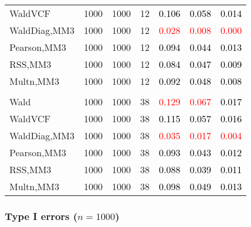 \documentclass[
]{article}
\begin{document}
\begin{table}[H]
{\begin{tabular}[t]{lrrrrrr}
\hspace{1em}WaldVCF & 1000 & 1000 & 12 & \textcolor{black}{0.106} & \textcolor{black}{0.058} & \textcolor{black}{0.014}\\
\hspace{1em}WaldDiag,MM3 & 1000 & 1000 & 12 & \textcolor{red}{0.028} & \textcolor{red}{0.008} & \textcolor{red}{0.000}\\
\hspace{1em}Pearson,MM3 & 1000 & 1000 & 12 & \textcolor{black}{0.094} & \textcolor{black}{0.044} & \textcolor{black}{0.013}\\
\hspace{1em}RSS,MM3 & 1000 & 1000 & 12 & \textcolor{black}{0.084} & \textcolor{black}{0.047} & \textcolor{black}{0.009}\\
\hspace{1em}Multn,MM3 & 1000 & 1000 & 12 & \textcolor{black}{0.092} & \textcolor{black}{0.048} & \textcolor{black}{0.008}\\
\addlinespace[0.3em]
\multicolumn{7}{l}{\textbf{3F 15V}}\\
\hspace{1em}Wald & 1000 & 1000 & 38 & \textcolor{red}{0.129} & \textcolor{red}{0.067} & \textcolor{black}{0.017}\\
\hspace{1em}WaldVCF & 1000 & 1000 & 38 & \textcolor{black}{0.115} & \textcolor{black}{0.057} & \textcolor{black}{0.016}\\
\hspace{1em}WaldDiag,MM3 & 1000 & 1000 & 38 & \textcolor{red}{0.035} & \textcolor{red}{0.017} & \textcolor{red}{0.004}\\
\hspace{1em}Pearson,MM3 & 1000 & 1000 & 38 & \textcolor{black}{0.093} & \textcolor{black}{0.043} & \textcolor{black}{0.012}\\
\hspace{1em}RSS,MM3 & 1000 & 1000 & 38 & \textcolor{black}{0.088} & \textcolor{black}{0.039} & \textcolor{black}{0.011}\\
\hspace{1em}Multn,MM3 & 1000 & 1000 & 38 & \textcolor{black}{0.098} & \textcolor{black}{0.049} & \textcolor{black}{0.013}\\
\bottomrule
\end{tabular}}
\endgroup{}
\end{table}

\hypertarget{type-i-errors-n1000-2}{%
\subsubsection{\texorpdfstring{Type I errors
(\(n=1000\))}{Type I errors (n=1000)}}\label{type-i-errors-n1000-2}}
\end{document}
